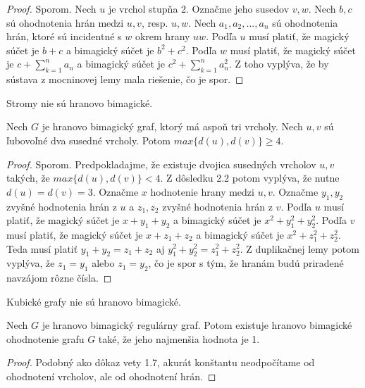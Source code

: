 \begin{proof} Sporom. Nech $u$ je vrchol stupňa 2. Označme jeho susedov $v,w$. Nech $b,c$ sú ohodnotenia hrán medzi $u,v$, resp. $u,w$. Nech $a_1, a_2, ... , a_n$ sú ohodnotenia hrán, ktoré sú incidentné s $w$ okrem hrany $uw$. Podľa $u$ musí platiť, že magický súčet je $b+c$ a bimagický súčet je $b^2 + c^2$. Podľa $w$ musí platiť, že magický súčet je $c + \sum_{k=1}^{n} a_n$ a bimagický súčet je $c^2 + \sum_{k=1}^{n} a^2_n$. Z toho vyplýva, že by sústava z mocninovej lemy mala riešenie, čo je spor.
\end{proof} 

\begin{subconsequence} Stromy nie sú hranovo bimagické.
\end{subconsequence}

\begin{subtheorem} Nech $G$ je hranovo bimagický graf, ktorý má aspoň tri vrcholy. Nech $u,v$ sú ľubovoľné dva susedné vrcholy. Potom $max \{d(u), d(v)\} \geq 4$.
\end{subtheorem}

\begin{proof} Sporom. Predpokladajme, že existuje dvojica susedných vrcholov $u,v$ takých, že $max \{d(u), d(v)\} < 4$. Z dôsledku 2.2 potom vyplýva, že nutne $d(u) = d(v) = 3$. Označme $x$ hodnotenie hrany medzi $u,v$. Označme $y_1, y_2$ zvyšné hodnotenia hrán z $u$ a $z_1, z_2$ zvyšné hodnotenia hrán z $v$. Podľa $u$ musí platiť, že magický súčet je $x + y_1 + y_2$ a bimagický súčet je $x^2 + y^2_1 + y^2_2$. Podľa $v$ musí platiť, že magický súčet je $x + z_1 + z_2$ a bimagický súčet je $x^2 + z^2_1 + z^2_2$. Teda musí platiť $y_1 + y_2 = z_1 + z_2$ aj $y^2_1 + y^2_2 = z^2_1 + z^2_2$. Z duplikačnej lemy potom vyplýva, že $z_1 = y_1$ alebo $z_1 = y_2$, čo je spor s tým, že hranám budú priradené navzájom rôzne čísla.
\end{proof} 

\begin{subconsequence} Kubické grafy nie sú hranovo bimagické.
\end{subconsequence}

\begin{subtheorem} Nech $G$ je hranovo bimagický regulárny graf. Potom existuje hranovo bimagické ohodnotenie grafu $G$ také, že jeho najmenšia hodnota je 1.
\end{subtheorem}

\begin{proof} Podobný ako dôkaz vety 1.7, akurát konštantu neodpočítame od ohodnotení vrcholov, ale od ohodnotení hrán.
\end{proof}

